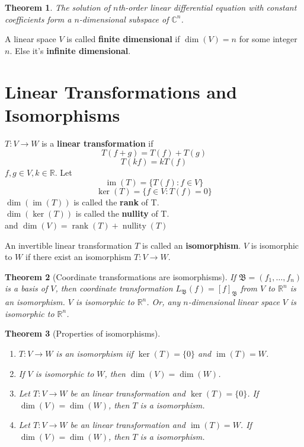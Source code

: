 \documentclass[letter]{article}
\newcommand{\R}{\mathbb{R}}
\newcommand{\B}{\mathfrak{B}}
\newcommand{\im}{\operatorname{im}}
\newcommand{\rank}{\operatorname{rank}}
\newcommand{\nullity}{\operatorname{nullity}}
\newtheorem{theorem}{Theorem}[section]
\newenvironment{definition}[1][Definition]{\begin{trivlist}
\item[\hskip \labelsep {\bfseries #1}]}{\end{trivlist}}
\begin{document}
\begin{theorem}
The solution of $n$th-order linear differential equation with constant coefficients form a $n$-dimensional subspace of $\mathbb{C}^n$.
\end{theorem}
\begin{definition}
A linear space $V$ is called \textbf{finite dimensional} if $\dim(V) = n$ for some integer $n$. Else it's \textbf{infinite dimensional}.
\end{definition}

\section{Linear Transformations and Isomorphisms}
\begin{definition}
$T:V\to W$ is a \textbf{linear transformation} if
\[T(f+g) = T(f)+T(g)\]
\[T(kf) = kT(f)\]
$f,g\in V, k\in \R$. Let
\[\im(T) = \{T(f):f\in V\}\]
\[\ker(T) = \{f\in V: T(f) = 0\}\]
$\dim(\im(T))$ is called the \textbf{rank} of T.\\
$\dim(\ker(T))$ is called the \textbf{nullity} of T.\\
and
$\dim(V) = \rank(T) + \nullity(T)$
\end{definition}

\begin{definition}
An invertible linear transformation $T$ is called an \textbf{isomorphism}. $V$ is isomorphic to $W$ if there exist an isomorphism $T:V\to W$.
\end{definition}

\begin{theorem}[Coordinate transformations are isomorphisms]
If $\B = (f_1,\ldots,f_n)$ is a basis of $V$, then coordinate transformation $L_\B(f) = [f]_\B$ from $V$ to $\R^n$ is an isomorphism. $V$ is isomorphic to $\R^n$. Or, any $n$-dimensional linear space $V$ is isomorphic to $\R^n$.
\end{theorem}

\begin{theorem}[Properties of isomorphisms]
\begin{enumerate}
\item $T:V\to W$ is an isomorphism iif $\ker(T) = \{0\}$ and $\im(T) = W$.
\item If $V$ is isomorphic to $W$, then $\dim(V) = \dim(W)$.
\item Let $T:V\to W$ be an linear transformation and $\ker(T) = \{0\}$. If $\dim(V) = \dim(W)$, then $T$ is a isomorphism.
\item Let $T:V\to W$ be an linear transformation and $\im(T) = W$. If $\dim(V) = \dim(W)$, then $T$ is a isomorphism.
\end{enumerate}
\end{theorem}
\end{document}

